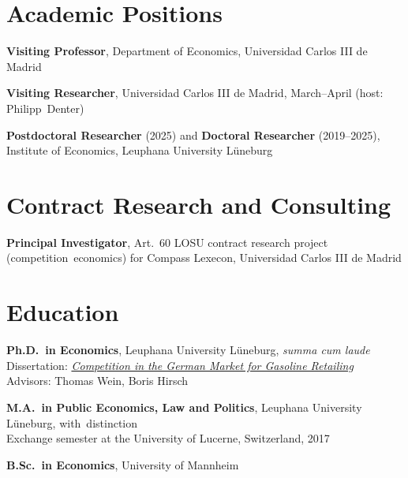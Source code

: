\documentclass[11pt,a4paper]{article}
\newcommand{\entry}[2]{\item[#1]#2}
\begin{document}
\section{Academic Positions}
\begin{entries}
  \entry{2025--present}{\textbf{Visiting Professor}, Department of Economics,
    Universidad Carlos III de Madrid}
  \entry{2025}{\textbf{Visiting Researcher}, Universidad Carlos III de Madrid,
    March--April (host: Philipp~Denter)}
  \entry{2019--2025}{\textbf{Postdoctoral Researcher} (2025) and \textbf{Doctoral Researcher}
    (2019--2025), Institute of Economics, Leuphana University Lüneburg}
\end{entries}

\section{Contract Research and Consulting}
\begin{entries}
  \entry{2026--2027}{\textbf{Principal Investigator}, Art.\ 60 LOSU contract research project
    \mbox{(competition economics)} for Compass Lexecon, Universidad Carlos III de Madrid}
\end{entries}

\section{Education}
\begin{entries}
  \entry{2025}{\textbf{Ph.D.\ in Economics}, Leuphana University Lüneburg, \textit{summa cum laude}\\
    Dissertation: \href{https://doi.org/10.48548/pubdata-1659}{\textit{Competition in the German Market for Gasoline Retailing}}\\
    Advisors: Thomas Wein, Boris Hirsch}
  \entry{2019}{\textbf{M.A.\ in Public Economics, Law and Politics}, Leuphana University Lüneburg,
    with~distinction\\
    Exchange semester at the University of Lucerne, Switzerland, 2017}
  \entry{2016}{\textbf{B.Sc.\ in Economics}, University of Mannheim}
\end{entries}

\end{document}
